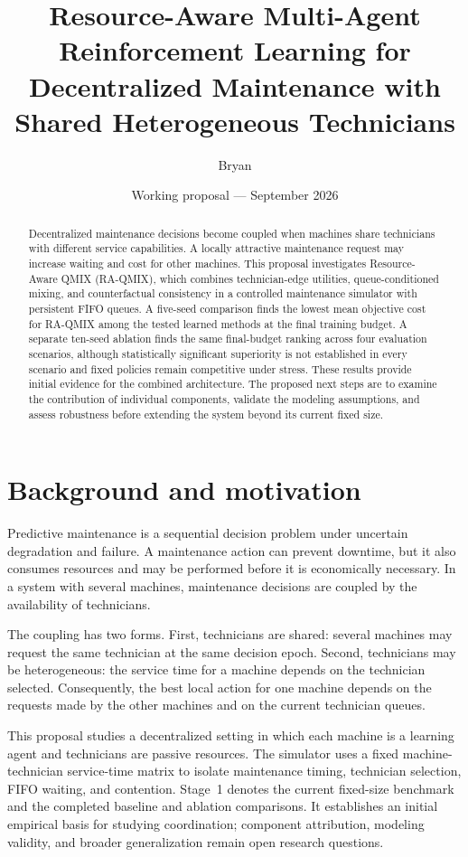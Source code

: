 \documentclass[11pt]{article}
\title{Resource-Aware Multi-Agent Reinforcement Learning for Decentralized Maintenance with Shared Heterogeneous Technicians}
\author{Bryan}
\date{Working proposal --- September 2026}
\begin{document}
\maketitle

\begin{abstract}
Decentralized maintenance decisions become coupled when machines share technicians with different service capabilities. A locally attractive maintenance request may increase waiting and cost for other machines. This proposal investigates Resource-Aware QMIX (RA-QMIX), which combines technician-edge utilities, queue-conditioned mixing, and counterfactual consistency in a controlled maintenance simulator with persistent FIFO queues. A five-seed comparison finds the lowest mean objective cost for RA-QMIX among the tested learned methods at the final training budget. A separate ten-seed ablation finds the same final-budget ranking across four evaluation scenarios, although statistically significant superiority is not established in every scenario and fixed policies remain competitive under stress. These results provide initial evidence for the combined architecture. The proposed next steps are to examine the contribution of individual components, validate the modeling assumptions, and assess robustness before extending the system beyond its current fixed size.
\end{abstract}

\section{Background and motivation}

Predictive maintenance is a sequential decision problem under uncertain degradation and failure. A maintenance action can prevent downtime, but it also consumes resources and may be performed before it is economically necessary. In a system with several machines, maintenance decisions are coupled by the availability of technicians.

The coupling has two forms. First, technicians are shared: several machines may request the same technician at the same decision epoch. Second, technicians may be heterogeneous: the service time for a machine depends on the technician selected. Consequently, the best local action for one machine depends on the requests made by the other machines and on the current technician queues.

This proposal studies a decentralized setting in which each machine is a learning agent and technicians are passive resources. The simulator uses a fixed machine-technician service-time matrix to isolate maintenance timing, technician selection, FIFO waiting, and contention. Stage~1 denotes the current fixed-size benchmark and the completed baseline and ablation comparisons. It establishes an initial empirical basis for studying coordination; component attribution, modeling validity, and broader generalization remain open research questions.
\end{document}
